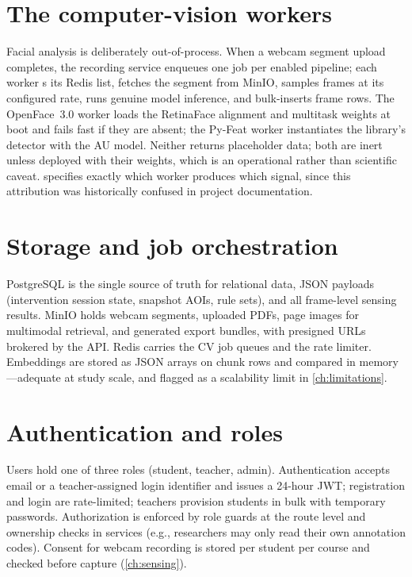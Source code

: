 \section{The computer-vision workers}
\label{sec:arch-workers}

Facial analysis is deliberately out-of-process. When a webcam segment
upload completes, the recording service enqueues one job per enabled
pipeline; each worker s its Redis list, fetches the segment
from MinIO, samples frames at its configured rate, runs genuine model
inference, and bulk-inserts frame rows. The OpenFace~3.0 worker loads the
RetinaFace alignment and multitask weights at boot and fails fast if they
are absent; the Py-Feat worker instantiates the library's detector with
the  AU model. Neither returns placeholder data; both are inert
unless deployed with their weights, which is an operational rather than
scientific caveat.  specifies exactly which worker
produces which signal, since this attribution was historically confused
in project documentation.

\section{Storage and job orchestration}
\label{sec:arch-storage}

PostgreSQL is the single source of truth for relational data, JSON
payloads (intervention session state, snapshot AOIs, rule sets), and all
frame-level sensing results. MinIO holds webcam segments, uploaded PDFs,
page images for multimodal retrieval, and generated export bundles, with
presigned URLs brokered by the API. Redis carries the CV job queues and
the rate limiter. Embeddings are stored as JSON arrays on chunk rows and
compared in memory---adequate at study scale, and flagged as a
scalability limit in \cref{ch:limitations}.

\section{Authentication and roles}
\label{sec:arch-auth}

Users hold one of three roles (student, teacher, admin). Authentication
accepts email or a teacher-assigned login identifier and issues a 24-hour
JWT; registration and login are rate-limited; teachers provision students
in bulk with temporary passwords. Authorization is enforced by role
guards at the route level and ownership checks in services (e.g.,
researchers may only read their own annotation codes). Consent for webcam
recording is stored per student per course and checked before capture
(\cref{ch:sensing}).

